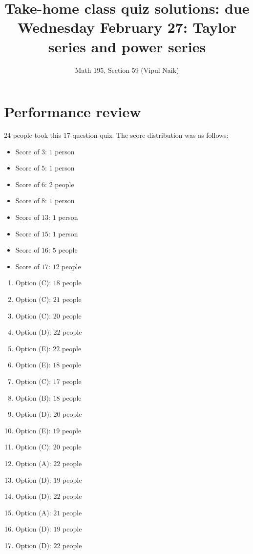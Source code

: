 \documentclass[10pt]{amsart}
\title{Take-home class quiz solutions: due Wednesday February 27: Taylor series and power series}
\author{Math 195, Section 59 (Vipul Naik)}
\begin{document}
\maketitle

\section{Performance review}

$24$ people took this $17$-question quiz. The score distribution was
as follows:

\begin{itemize}
\item Score of $3$: $1$ person
\item Score of $5$: $1$ person
\item Score of $6$: $2$ people
\item Score of $8$: $1$ person
\item Score of $13$: $1$ person
\item Score of $15$: $1$ person
\item Score of $16$: $5$ people
\item Score of $17$: $12$ people
\end{itemize}

\begin{enumerate}
\item Option (C): $18$ people
\item Option (C): $21$ people
\item Option (C): $20$ people
\item Option (D): $22$ people
\item Option (E): $22$ people
\item Option (E): $18$ people
\item Option (C): $17$ people
\item Option (B): $18$ people
\item Option (D): $20$ people
\item Option (E): $19$ people
\item Option (C): $20$ people
\item Option (A): $22$ people
\item Option (D): $19$ people
\item Option (D): $22$ people
\item Option (A): $21$ people
\item Option (D): $19$ people
\item Option (D): $22$ people
\end{enumerate}
\end{document}
